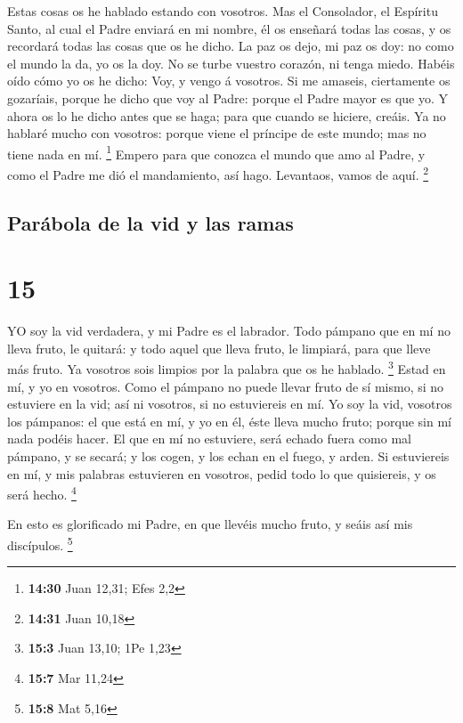  Estas cosas os he hablado estando con vosotros.
 Mas el Consolador, el Espíritu Santo, al cual el Padre
enviará en mi nombre, él os enseñará todas las cosas, y os recordará
todas las cosas que os he dicho.  La paz os dejo, mi paz os
doy: no como el mundo la da, yo os la doy. No se turbe vuestro corazón,
ni tenga miedo.  Habéis oído cómo yo os he dicho: Voy, y
vengo á vosotros. Si me amaseis, ciertamente os gozaríais, porque he
dicho que voy al Padre: porque el Padre mayor es que yo.  Y
ahora os lo he dicho antes que se haga; para que cuando se hiciere,
creáis.  Ya no hablaré mucho con vosotros: porque viene el
príncipe de este mundo; mas no tiene nada en mí. \footnote{\textbf{14:30}
  Juan 12,31; Efes 2,2}  Empero para que conozca el mundo
que amo al Padre, y como el Padre me dió el mandamiento, así hago.
Levantaos, vamos de aquí. \footnote{\textbf{14:31} Juan 10,18}

\hypertarget{paruxe1bola-de-la-vid-y-las-ramas}{%
\subsection{Parábola de la vid y las
ramas}\label{paruxe1bola-de-la-vid-y-las-ramas}}

\hypertarget{section-14}{%
\section{15}\label{section-14}}

 YO soy la vid verdadera, y mi Padre es el labrador.
 Todo pámpano que en mí no lleva fruto, le quitará: y todo
aquel que lleva fruto, le limpiará, para que lleve más fruto.
 Ya vosotros sois limpios por la palabra que os he hablado.
\footnote{\textbf{15:3} Juan 13,10; 1Pe 1,23}  Estad en mí,
y yo en vosotros. Como el pámpano no puede llevar fruto de sí mismo, si
no estuviere en la vid; así ni vosotros, si no estuviereis en mí.
 Yo soy la vid, vosotros los pámpanos: el que está en mí, y
yo en él, éste lleva mucho fruto; porque sin mí nada podéis hacer.
 El que en mí no estuviere, será echado fuera como mal
pámpano, y se secará; y los cogen, y los echan en el fuego, y arden.
 Si estuviereis en mí, y mis palabras estuvieren en
vosotros, pedid todo lo que quisiereis, y os será hecho. \footnote{\textbf{15:7}
  Mar 11,24}

 En esto es glorificado mi Padre, en que llevéis mucho
fruto, y seáis así mis discípulos. \footnote{\textbf{15:8} Mat 5,16}

